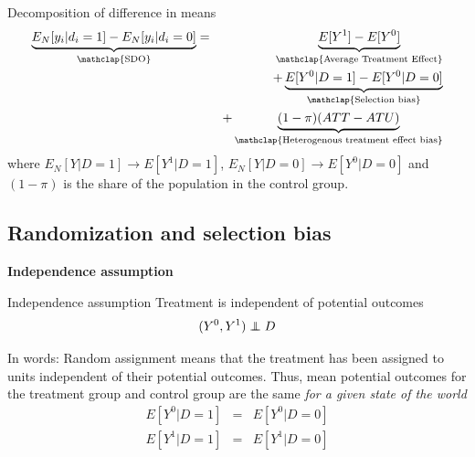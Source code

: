 \documentclass[notes=show]{beamer}
\newcommand\independent{\protect\mathpalette{\protect\independenT}{\perp}}
\def\independenT#1#2{\mathrel{\rlap{$#1#2$}\mkern2mu{#1#2}}}
\begin{document}
\begin{frame}[plain]

	\begin{block}{Decomposition of difference in means}
		\begin{eqnarray*}
		\underbrace{E_N[y_i | d_i=1] - E_N[y_i | d_i=0]}_{ \mathclap{\text{SDO}}}&=& \underbrace{E[Y^1] - E[Y^0]}_{ \mathclap{\text{Average Treatment Effect}}} \\
		&&+ \underbrace{E[Y^0|D=1] - E[Y^0 | D=0]}_{ \mathclap{\text{Selection bias}}}  \\
		&& + \underbrace{(1-\pi)(ATT - ATU)}_{ \mathclap{\text{Heterogenous treatment effect bias}}} 
		\end{eqnarray*}
	where $E_N[Y|D=1] \to E[Y^1 | D=1]$, $E_N[Y|D=0] \to E[Y^0|D=0]$ and $(1-\pi)$ is the share of the population in the control group.
	\end{block}
		
\end{frame}

	

\subsection{Randomization and selection bias}


\begin{frame}[shrink=20]
	\begin{center}
	\textbf{Independence assumption}
	\end{center}
	

	\begin{block}{Independence assumption}
	Treatment is independent of potential outcomes  $$(Y^0,Y^1)\independent{D}$$
	
	In words: Random assignment means that the treatment has been assigned to units independent of their potential outcomes.  Thus, mean potential outcomes for the treatment group and control group are the same \emph{for a given state of the world} 
		\begin{eqnarray*}
			E[Y^0|D=1] &=& E[Y^0 | D=0] \\
			E[Y^1|D=1] &=& E[Y^1 | D=0] 
		\end{eqnarray*}
	\end{block}
\end{frame}
\end{document}
